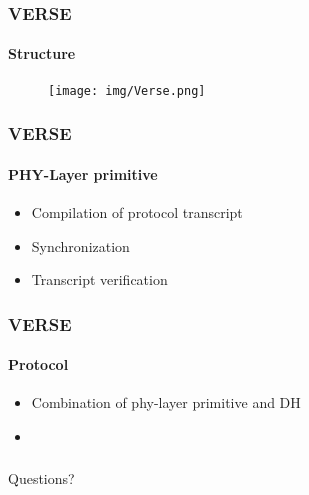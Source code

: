 \documentclass{beamer}
\begin{document}
\begin{frame}
	\frametitle{VERSE}
	\framesubtitle{Structure}
	\begin{figure}
		\texttt{[image: img/Verse.png]}
	\end{figure}

\end{frame}

\begin{frame}
	\frametitle{VERSE}
	\framesubtitle{PHY-Layer primitive}
	\begin{itemize}
		\item Compilation of protocol transcript
		\item Synchronization
		\item Transcript verification
	\end{itemize}
\end{frame}

\begin{frame}
	\frametitle{VERSE}
	\framesubtitle{Protocol}
	\begin{itemize}
		\item Combination of phy-layer primitive and DH
		\item  
	\end{itemize}
\end{frame}

\begin{frame}
	\frametitle{}
	\framesubtitle{}
	\vfil
	Questions?
\end{frame}
\end{document}
